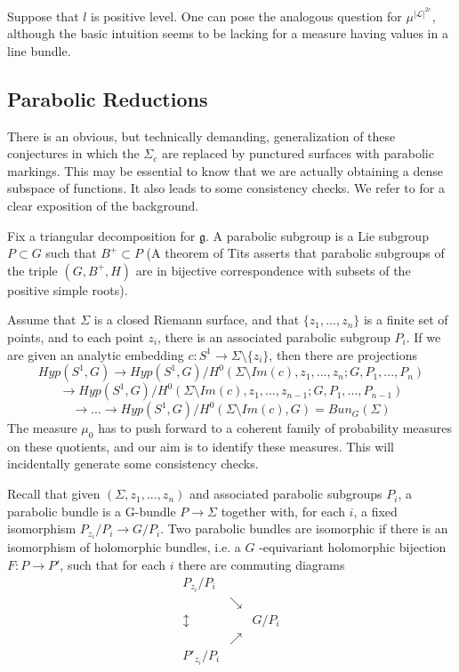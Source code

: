 \documentclass{amsart}
\theoremstyle{conjecture}
\theoremstyle{definition}
\theoremstyle{question}
\theoremstyle{questions}
\theoremstyle{remark}
\theoremstyle{remarks}
\theoremstyle{example}
\numberwithin{equation}{section}
\begin{document}
Suppose that $l$ is positive level. One can pose the analogous question for $\mu^{|\mathcal L|^{2c}}$, although
the basic intuition seems to be lacking for a measure having values in a line bundle.


\subsection{Parabolic Reductions}

There is an obvious, but technically demanding, generalization of these conjectures in which the $\Sigma_c$ are replaced by punctured surfaces with parabolic markings. This may be essential to know that we are actually obtaining a dense subspace of functions. It also leads to some consistency checks. We refer to \cite{TW} for a clear exposition of the background.

Fix a triangular decomposition for $\mathfrak g$. A parabolic subgroup is a Lie subgroup $P\subset G$ such that
$B^+\subset P$ (A theorem of Tits asserts that parabolic subgroups of the triple $(G,B^+,H)$ are in bijective
correspondence with subsets of the positive simple roots).

Assume that $\Sigma$ is a closed Riemann surface, and that $\{z_1,...,z_n\}$ is a finite set of points, and to each point $z_i$, there is
an associated parabolic subgroup $P_i$. If we are given an analytic embedding $c:S^1\to \Sigma\setminus\{z_i\}$,
then there are projections
\begin{equation}\label{projections}Hyp(S^1,G)\to Hyp(S^1,G)/H^0(\Sigma\setminus Im(c),z_1,...,z_n;G,P_1,...,P_n)
\end{equation}
$$\to Hyp(S^1,G)/H^0(\Sigma\setminus Im(c),z_1,...,z_{n-1};G,P_1,...,P_{n-1}) $$
$$\to ...\to Hyp(S^1,G)/H^0(\Sigma\setminus Im(c),G)=Bun_G(\Sigma)$$
The measure $\mu_0$ has to push forward to a coherent family of probability measures on these quotients,
and our aim is to identify these measures. This will incidentally generate some consistency checks.

Recall that given $(\Sigma,z_1,...,z_n)$ and associated
parabolic subgroups $P_i$, a parabolic bundle
is a G-bundle $P\to \Sigma$ together with, for each $i$,  a fixed isomorphism
$ P_{z_i}/P_i \to G/P_i$. Two parabolic bundles are isomorphic if there is an isomorphism of
holomorphic bundles, i.e. a $G$ -equivariant
holomorphic bijection $F: P \to P'$, such that for each $i$ there are commuting diagrams
$$\begin{matrix} P_{z_i}/P_i & & \\ &  \searrow &\\ \updownarrow & & G/P_i\\& \nearrow& \\
P'_{z_i}/P_i & &\end{matrix} $$
\end{document}
